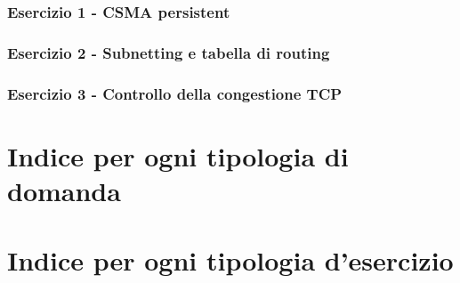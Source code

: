 \documentclass[a4paper]{article}
\begin{document}
	\subsubsection{Esercizio 1 - CSMA persistent}
	
	\subsubsection{Esercizio 2 - Subnetting e tabella di routing}
	
	\subsubsection{Esercizio 3 - Controllo della congestione TCP}
	
	\newpage

	\section{Indice per ogni tipologia di domanda}

	\section{Indice per ogni tipologia d'esercizio}
\end{document}
